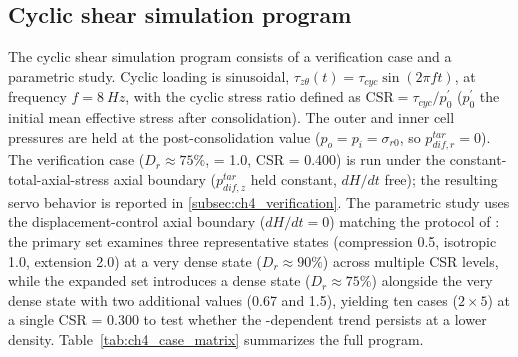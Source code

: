 \documentclass[../main]{subfiles}
\begin{document}
\subsection{Cyclic shear simulation program}
\label{subsec:ch4_cyclic_program}

The cyclic shear simulation program consists of a verification case and a parametric \Kzero{} study. Cyclic loading is sinusoidal, $\tau_{z\theta}(t) = \tau_{cyc}\sin(2\pi f t)$, at frequency $f = \SI{8}{Hz}$, with the cyclic stress ratio defined as $\mathrm{CSR} = \tau_{cyc}/p_0^{\prime}$ ($p_0^{\prime}$ the initial mean effective stress after consolidation). The outer and inner cell pressures are held at the post-consolidation value ($p_o=p_i=\sigma_{r0}$, so $p_{dif,r}^{tar}=0$). The verification case ($D_r \approx 75\%$, \Kzero{} = 1.0, CSR = 0.400) is run under the constant-total-axial-stress axial boundary ($p_{dif,z}^{tar}$ held constant, $dH/dt$ free); the resulting servo behavior is reported in \cref{subsec:ch4_verification}. The parametric \Kzero{} study uses the displacement-control axial boundary ($dH/dt=0$) matching the protocol of \citet{Ishihara1985}: the primary set examines three representative \Kzero{} states (compression 0.5, isotropic 1.0, extension 2.0) at a very dense state ($D_r \approx 90\%$) across multiple CSR levels, while the expanded set introduces a dense state ($D_r \approx 75\%$) alongside the very dense state with two additional \Kzero{} values (0.67 and 1.5), yielding ten cases ($2 \times 5$) at a single CSR = 0.300 to test whether the \Kzero{}-dependent trend persists at a lower density. Table~\ref{tab:ch4_case_matrix} summarizes the full program.
\end{document}

